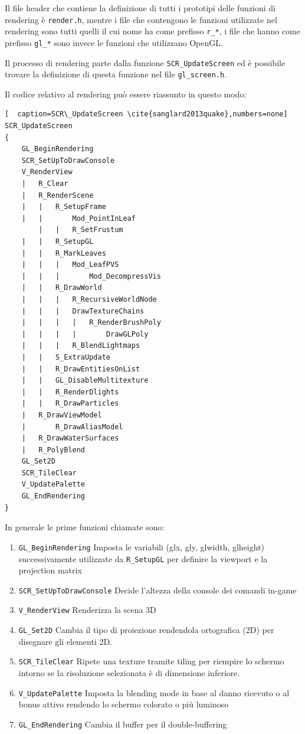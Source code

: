 \documentclass[12pt, letterpaper]{article}
\begin{document}
Il file header che contiene la definizione di tutti i prototipi delle funzioni di rendering è \texttt{render.h}, mentre i file che contengono le funzioni utilizzate nel rendering sono tutti quelli il cui nome ha come prefisso \texttt{r\_*}, i file che hanno come prefisso \texttt{gl\_*} sono invece le funzioni che utilizzano OpenGL. \cite{idsoftware:quake}

Il processo di rendering parte dalla funzione \texttt{SCR\_UpdateScreen} ed è possibile trovare la definizione di questa funzione nel file \texttt{gl\_screen.h}.

Il codice relativo al rendering può essere riassunto in questo modo: \newline

\begin{lstlisting}[  caption=SCR\_UpdateScreen \cite{sanglard2013quake},numbers=none]
SCR_UpdateScreen 		
{ 
	GL_BeginRendering
	SCR_SetUpToDrawConsole
	V_RenderView
	|	R_Clear
	|	R_RenderScene
	|	|	R_SetupFrame
	|	|		Mod_PointInLeaf
        |	|	R_SetFrustum
	|	|	R_SetupGL
	|	|	R_MarkLeaves
	|	|	|	Mod_LeafPVS
	|	|	|		Mod_DecompressVis
	|	|	R_DrawWorld
	|	|	|	R_RecursiveWorldNode
	|	|	|	DrawTextureChains
	|	|	|	|	R_RenderBrushPoly
	|	|	|	|		DrawGLPoly
	|	|	|	R_BlendLightmaps
	|	|	S_ExtraUpdate
	|	|	R_DrawEntitiesOnList
	|	|	GL_DisableMultitexture
	|	|	R_RenderDlights
	|	|	R_DrawParticles
	|	R_DrawViewModel
	|		R_DrawAliasModel
	|	R_DrawWaterSurfaces
	|	R_PolyBlend
	GL_Set2D
	SCR_TileClear
	V_UpdatePalette
	GL_EndRendering
}
\end{lstlisting}

In generale le prime funzioni chiamate sono:
\begin{enumerate}
\item \texttt{GL\_BeginRendering} Imposta le variabili (glx, gly, glwidth, glheight) successivamente utilizzate da \texttt{R\_SetupGL} per definire la viewport e la projection matrix
\item \texttt{SCR\_SetUpToDrawConsole} Decide l'altezza della console dei comandi in-game
\item \texttt{V\_RenderView} Renderizza la scena 3D
\item \texttt{GL\_Set2D} Cambia il tipo di proiezione rendendola ortografica (2D) per disegnare gli elementi 2D.
\item \texttt{SCR\_TileClear} Ripete una texture tramite tiling per riempire lo schermo intorno se la risoluzione selezionata è di dimensione inferiore.
\item \texttt{V\_UpdatePalette} Imposta la blending mode in base al danno ricevuto o al bonus attivo rendendo lo schermo colorato o più luminoso
\item \texttt{GL\_EndRendering} Cambia il buffer per il double-buffering
\end{enumerate}
\end{document}
